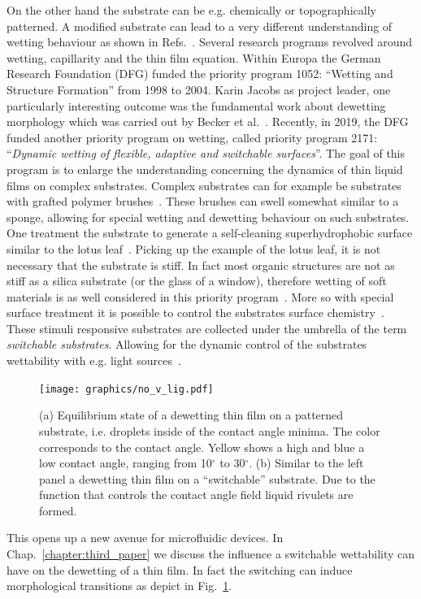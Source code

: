 On the other hand the substrate can be e.g. chemically or topographically patterned.
A modified substrate can lead to a very different understanding of wetting behaviour as shown in Refs.~\cite{cassieWettabilityPorousSurfaces1944, whymanRigorousDerivationYoung2008}.
Several research programs revolved around wetting, capillarity and the thin film equation. 
Within Europa the German Research Foundation (DFG) funded the priority program 1052: ``Wetting and Structure Formation'' from 1998 to 2004.
Karin Jacobs as project leader, one particularly interesting outcome was the fundamental work about dewetting morphology which was carried out by Becker et al.~\cite{beckerComplexDewettingScenarios2003}. 
Recently, in 2019, the DFG funded another priority program on wetting, called priority program 2171: ``\textit{Dynamic wetting of flexible, adaptive and switchable surfaces}''. 
The goal of this program is to enlarge the understanding concerning the dynamics of thin liquid films on complex substrates.
Complex substrates can for example be substrates with grafted polymer brushes~\cite{thieleGradientDynamicsModel2020}.
These brushes can swell somewhat similar to a sponge, allowing for special wetting and dewetting behaviour on such substrates. 
One treatment the substrate to generate a self-cleaning superhydrophobic surface similar to the lotus leaf~\cite{liAdaptationStyreneAcrylic2021, wongMicrodropletContaminantsWhen2020}.
Picking up the example of the lotus leaf, it is not necessary that the substrate is stiff.
In fact most organic structures are not as stiff as a silica substrate (or the glass of a window), therefore wetting of soft materials is as well considered in this priority program~\cite{andreottiStaticsDynamicsSoft2020, alandUnifiedNumericalModel2021, chenShortTimeWetting2011}.
More so with special surface treatment it is possible to control the substrates surface chemistry~\cite{xinReversiblySwitchableWettability2010, wangPhotoresponsiveSurfacesControllable2007}.
These stimuli responsive substrates are collected under the umbrella of the term \textit{switchable substrates}.
Allowing for the dynamic control of the substrates wettability with e.g. light sources~\cite{ichimuraLightDrivenMotionLiquids2000, sekiWideArrayPhotoinduced2018}.
\begin{figure}
    \centering
    \texttt{[image: graphics/no\_v\_lig.pdf]}
    \caption{(a) Equilibrium state of a dewetting thin film on a patterned substrate, i.e. droplets inside of the contact angle minima. 
    The color corresponds to the contact angle. 
    Yellow shows a high and blue a low contact angle, ranging from 10$^{\circ}$ to 30$^{\circ}$. 
    (b) Similar to the left panel a dewetting thin film on a ``switchable'' substrate. 
    Due to the function that controls the contact angle field liquid rivulets are formed.}
    \label{fig:morph_transition}
\end{figure}
This opens up a new avenue for microfluidic devices.
In Chap.~\ref{chapter:third_paper} we discuss the influence a switchable wettability can have on the dewetting of a thin film.
In fact the switching can induce morphological transitions as depict in Fig.~\ref{fig:morph_transition}. 

